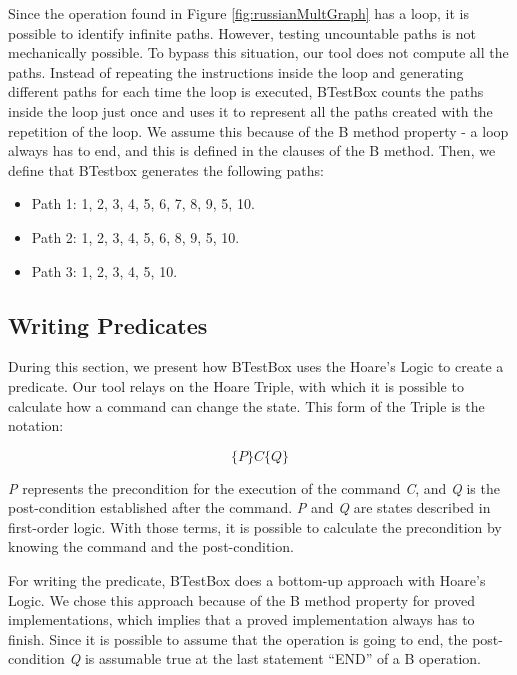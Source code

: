 \documentclass[runningheads]{llncs}
\begin{document}
Since the operation found in Figure \ref{fig:russianMultGraph} has a loop, it is possible to identify infinite paths. However, testing uncountable paths is not mechanically possible.
To bypass this situation, our tool does not compute all the paths. Instead of repeating the instructions inside the loop and generating different paths for each time the loop is executed, BTestBox counts the paths inside the loop just once and uses it to represent all the paths created with the repetition of the loop. We assume this because of the B method property - a loop always has to end, and this is defined in the clauses of the B method. Then, we define that BTestbox generates the following paths:

\begin{itemize}
    \item Path 1: 1, 2, 3, 4, 5, 6, 7, 8, 9, 5, 10.
    \item Path 2: 1, 2, 3, 4, 5, 6, 8, 9, 5, 10.
    \item Path 3: 1, 2, 3, 4, 5, 10.
\end{itemize}

\subsection{Writing Predicates} \label{writingPredicates}

During this section, we present how BTestBox uses the Hoare’s Logic to create a predicate. Our tool relays on the Hoare Triple, with which it is possible to calculate how a command can change the state. 
This form of the Triple is the notation:

$$\{P\} C \{Q\}$$

\textit{P} represents the precondition for the execution of the command \textit{C}, and \textit{Q} is the post-condition established after the command. \textit{P} and \textit{Q} are states described in first-order logic. With those terms, it is possible to calculate the precondition by knowing the command and the post-condition. 

For writing the predicate, BTestBox does a bottom-up approach with Hoare's Logic. We chose this approach because of the B method property for proved implementations, which implies that a proved implementation always has to finish. Since it is possible to assume that the operation is going to end, the post-condition \textit{Q} is assumable true at the last statement ``END'' of a B operation.
\end{document}
